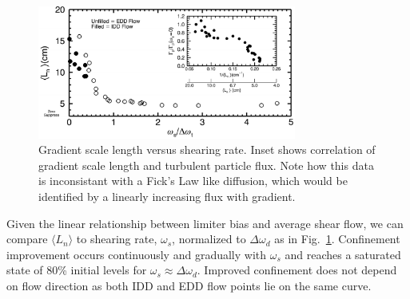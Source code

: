 \documentclass[%
 aps,
 prl,
 amsmath,amssymb,
 reprint,%
]{revtex4-1}
\begin{document}
\begin{figure}
\begin{center}
\includegraphics[width=8.5cm]{shearandgrad.pdf}%
\caption{\label{fig:shearandgrad} Gradient scale length versus shearing rate. Inset shows correlation of gradient scale length and turbulent particle flux. Note how this data is inconsistant with a Fick's Law like diffusion, which would be identified by a linearly increasing flux with gradient.}
\end{center}
\end{figure}

Given the linear relationship between limiter bias and average shear flow, we can compare $\langle L_{n} \rangle$ to shearing rate, $\omega_{s}$, normalized to $\Delta \omega_{d}$ as in Fig.~\ref{fig:shearandgrad}. Confinement improvement occurs continuously and gradually with $\omega_{s}$ and reaches a saturated state of 80\% initial levels for $\omega_{s} \approx \Delta \omega_{d}$. Improved confinement does not depend on flow direction as both IDD and EDD flow points lie on the same curve.
\end{document}
